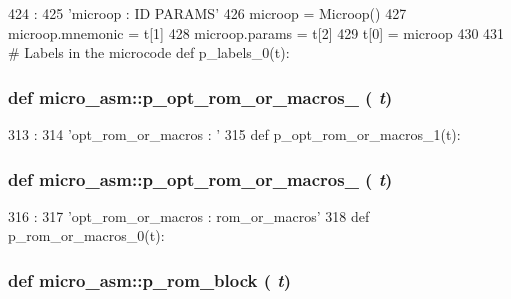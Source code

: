 \begin{DoxyCode}
424                   :
425     'microop : ID PARAMS'
426     microop = Microop()
427     microop.mnemonic = t[1]
428     microop.params = t[2]
429     t[0] = microop
430 
431 # Labels in the microcode
def p_labels_0(t):
\end{DoxyCode}
\hypertarget{namespacemicro__asm_a428b8086af1d1528aff7252fa2990344}{
\subsubsection[{p\_\-opt\_\-rom\_\-or\_\-macros\_\-0}]{\setlength{\rightskip}{0pt plus 5cm}def micro\_\-asm::p\_\-opt\_\-rom\_\-or\_\-macros\_ ( {\em t})}}
\label{namespacemicro__asm_a428b8086af1d1528aff7252fa2990344}



\begin{DoxyCode}
313                             :
314     'opt_rom_or_macros : '
315 
def p_opt_rom_or_macros_1(t):
\end{DoxyCode}
\hypertarget{namespacemicro__asm_af9fedecba85a450dedbeba1844439c48}{
\subsubsection[{p\_\-opt\_\-rom\_\-or\_\-macros\_\-1}]{\setlength{\rightskip}{0pt plus 5cm}def micro\_\-asm::p\_\-opt\_\-rom\_\-or\_\-macros\_ ( {\em t})}}
\label{namespacemicro__asm_af9fedecba85a450dedbeba1844439c48}



\begin{DoxyCode}
316                             :
317     'opt_rom_or_macros : rom_or_macros'
318 
def p_rom_or_macros_0(t):
\end{DoxyCode}
\hypertarget{namespacemicro__asm_a85628206b0efb164296ad31d33c4e6c1}{
\subsubsection[{p\_\-rom\_\-block}]{\setlength{\rightskip}{0pt plus 5cm}def micro\_\-asm::p\_\-rom\_\-block ( {\em t})}}
\label{namespacemicro__asm_a85628206b0efb164296ad31d33c4e6c1}



